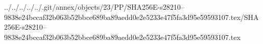 ../../../../../.git/annex/objects/23/PP/SHA256E-s28210--9838e24bccaf32b063b52bbce689ba89aedd0e2e5233e47f5fa3d95e59593107.tex/SHA256E-s28210--9838e24bccaf32b063b52bbce689ba89aedd0e2e5233e47f5fa3d95e59593107.tex